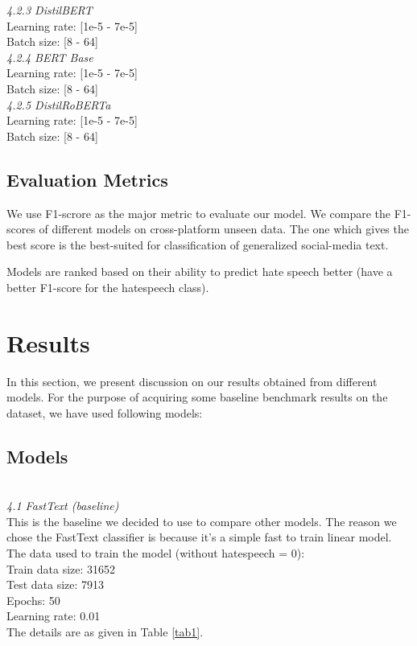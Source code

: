 \documentclass[a4paper, 10pt, conference]{IEEEtran}
\begin{document}
{{{{\noindent\textit{4.2.3 DistilBERT}\\
Learning rate: [1e-5 - 7e-5] \\
Batch size: [8 - 64]
\\

\noindent\textit{4.2.4 BERT Base}\\
Learning rate: [1e-5 - 7e-5] \\
Batch size: [8 - 64]
\\

\noindent\textit{4.2.5 DistilRoBERTa}\\
Learning rate: [1e-5 - 7e-5] \\
Batch size: [8 - 64]
\\



\subsection{Evaluation Metrics}
We use F1-scrore as the major metric to evaluate our model. We compare the F1-scores of different models on cross-platform unseen data. The one which gives the best score is the best-suited for classification of generalized social-media text.

Models are ranked based on their ability to predict hate speech better (have a better F1-score for the hatespeech class).}

\section{Results}
In this section, we present discussion on our results obtained from different models. For the purpose of acquiring some baseline benchmark results on the dataset, we have used following models:

\subsection{Models}\\

\noindent\textit{4.1 FastText (baseline)}\\

This is the baseline we decided to use to compare other models. The reason we chose the FastText classifier is because it's a simple fast to train linear model. The data used to train the model (without hatespeech = 0):\\
Train data size: 31652\\
Test data size: 7913\\
Epochs: 50 \\
Learning rate: 0.01\\
The details are as given in Table \ref{tab1}.

}}}
\end{document}
